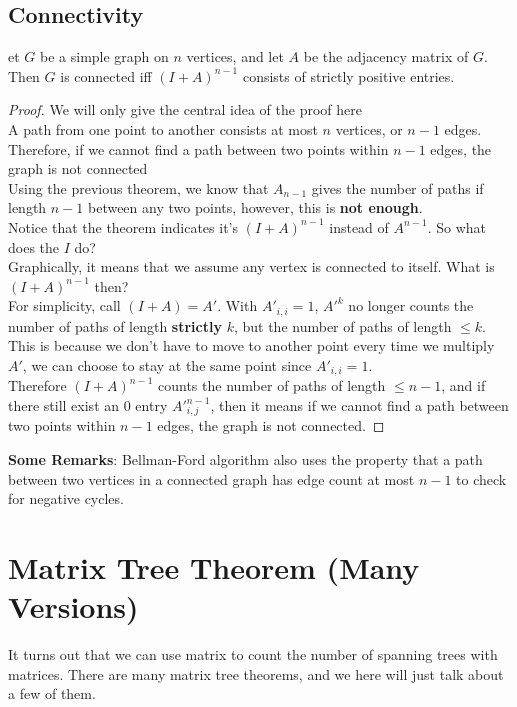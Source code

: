 \documentclass[12pt]{article}
\newenvironment{theorem}[2][Theorem]{\begin{trivlist}
\item[\hskip \labelsep {\bfseries #1}\hskip \labelsep {\bfseries #2.}]}{\end{trivlist}}
\begin{document}
\subsection{Connectivity}
\begin{theorem}
	Let $G$ be a simple graph on $n$ vertices, and let $A$ be the
	adjacency matrix of $G .$ Then $G$ is connected iff $( I + A ) ^ { n - 1 }$
	consists of strictly positive entries.
\end{theorem}
\begin{proof}
	We will only give the central idea of the proof here\\
	\newline
	A path from one point to another consists at most $n$ vertices, or $n-1$ edges. Therefore, if we cannot find a path between two points within $n-1$ edges, the graph is not connected\\
	\newline
	Using the previous theorem, we know that $A_{n-1}$ gives the number of paths if length $n-1$ between any two points, however, this is \textbf{not enough}.\\
	\newline
	Notice that the theorem indicates it's $(I + A)^{n-1}$ instead of $A^{n-1}$. So what does the $I$ do?\\
	\newline
	Graphically, it means that we assume any vertex is connected to itself. What is $(I + A)^{n-1}$ then? \\
	\newline
	For simplicity, call $(I + A) = A'$. With $A'_{i, i} = 1$, $A'^{k}$ no longer counts the number of paths of length \textbf{strictly} $k$, but the number of paths of length $\leq k$. This is because we don't have to move to another point every time we multiply $A'$, we can choose to stay at the same point since $A'_{i, i} = 1$.\\
	\newline
	Therefore $(I + A)^{n-1}$ counts the number of paths of length $\leq n - 1$, and if there still exist an 0 entry $A'^{n-1}_{i, j}$, then it means if we cannot find a path between two points within $n-1$ edges, the graph is not connected.
\end{proof}

\textbf{Some Remarks}: Bellman-Ford algorithm also uses the property that a path between two vertices in a connected graph has edge count at most $n-1$ to check for negative cycles.


\section{Matrix Tree Theorem (Many Versions)}
It turns out that we can use matrix to count the number of spanning trees with matrices. There are many matrix tree theorems, and we here will just talk about a few of them.\\
\end{document}
